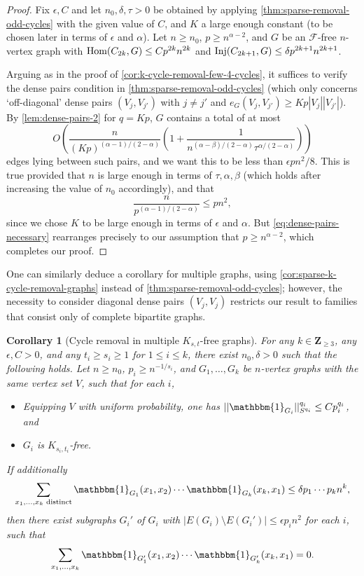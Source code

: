 \documentclass[reqno,11pt]{amsart}
\newtheorem{corollary}[theorem]{Corollary}
\theoremstyle{definition}
\theoremstyle{remark}
\numberwithin{equation}{section}
\newcommand{\Z}{\mathbf{Z}}
\newcommand{\mF}{\mathcal{F}}
\newcommand{\one}{\mathbbm{1}}
\newcommand{\Hom}{\textnormal{Hom}}
\newcommand{\Inj}{\textnormal{Inj}}
\begin{document}
\begin{proof}
Fix $\epsilon, C$ and let $n_0, \delta, \tau > 0$ be obtained by applying \cref{thm:sparse-removal-odd-cycles} with the given value of $C$, and $K$ a large enough constant (to be chosen later in terms of $\epsilon$ and $\alpha$). Let $n \ge n_0$, $p \ge n^{\alpha - 2}$, and $G$ be an $\mF$-free $n$-vertex graph with $\Hom(C_{2k}, G) \le Cp^{2k}n^{2k}$ and $\Inj(C_{2k+1}, G) \le \delta p^{2k+1} n^{2k+1}$.

Arguing as in the proof of \cref{cor:k-cycle-removal-few-4-cycles}, it suffices to verify the dense pairs condition in \cref{thm:sparse-removal-odd-cycles} (which only concerns `off-diagonal' dense pairs $(V_j, V_{j'})$ with $j \neq j'$ and $e_G(V_j, V_{j'}) \ge K p |V_j| |V_{j'}|$). By \cref{lem:dense-pairs-2} for $q = Kp$, $G$ contains a total of at most
\[
    O\left(\frac{n}{(Kp)^{(\alpha-1)/(2-\alpha)}}
    \left(1 + \frac{1}{n^{(\alpha - \beta)/(2 - \alpha)} \tau^{\alpha/(2-\alpha)}}\right) \right)
\]
edges lying between such pairs, and we want this to be less than $\epsilon p n^2/8$. This is true provided that $n$ is large enough in terms of $\tau, \alpha, \beta$ (which holds after increasing the value of $n_0$ accordingly), and that
\begin{equation} \label{eq:dense-pairs-necessary}
    \frac{n}{p^{(\alpha-1)/(2-\alpha)}}
    \le 
    p n^2,
\end{equation}
since we chose $K$ to be large enough in terms of $\epsilon$ and $\alpha$. But \cref{eq:dense-pairs-necessary} rearranges precisely to our assumption that $p \ge n^{\alpha - 2}$, which completes our proof.
\end{proof}

One can similarly deduce a corollary for multiple graphs, using \cref{cor:sparse-k-cycle-removal-graphs} instead of \cref{thm:sparse-removal-odd-cycles}; however, the necessity to consider diagonal dense pairs $(V_j, V_j)$ restricts our result to families that consist only of complete bipartite graphs.

\begin{corollary}[Cycle removal in multiple $K_{s,t}$-free graphs] \label{cor:k-cycle-removal-kst-free}
For any $k \in \Z_{\ge 3}$, any $\epsilon, C > 0$, and any $t_i \ge s_i \ge 1$ for $1 \le i \le k$, there exist $n_0, \delta > 0$ such that the following holds. Let $n \ge n_0$, $p_i \ge n^{-1/s_i}$, and $G_1, \ldots, G_k$ be $n$-vertex graphs with the same vertex set $V$, such that for each $i$,
\begin{itemize}
    \item[$(i)$.] Equipping $V$ with uniform probability, one has $||\one_{G_i}||_{S^{q_i}}^{q_i} \le C p_i^{q_i}$, and
    \item[$(ii)$.] $G_i$ is $K_{s_i, t_i}$-free.
\end{itemize}
If additionally
\[
    \sum_{x_1, \ldots, x_k \text{ distinct}} \one_{G_1}(x_1, x_2) \cdots \one_{G_k}(x_k, x_1) \le \delta p_1 \cdots p_k n^k,
\]
then there exist subgraphs $G_i'$ of $G_i$ with $|E(G_i) \setminus E(G_i')| \le \epsilon p_i n^2$ for each $i$, such that
\[
    \sum_{x_1, \ldots, x_k} \one_{G_1'}(x_1, x_2) \cdots \one_{G_k'}(x_k, x_1) = 0.
\]
\end{corollary}
\end{document}

